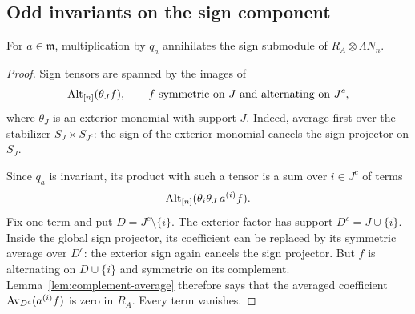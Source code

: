 \subsection{Odd invariants on the sign component}

\begin{lemma}\label{lem:odd-annihilation}
For $a\in\mathfrak m$, multiplication by $q_a$
annihilates the sign submodule of
$R_A\otimes\Lambda N_n$.
\end{lemma}

\begin{proof}
Sign tensors are spanned by the images of
\[
 \operatorname{Alt}_{[n]}(\theta_J f),
 \qquad
 f\text{ symmetric on }J
       \text{ and alternating on }J^c,
\]
where $\theta_J$ is an exterior monomial with support $J$.
Indeed, average first over the stabilizer
$S_J\times S_{J^c}$: the sign of the exterior monomial
cancels the sign projector on $S_J$.

Since $q_a$ is invariant, its product with such a tensor
is a sum over $i\in J^c$ of terms
\[
 \operatorname{Alt}_{[n]}(\theta_i\theta_J\,a^{(i)}f).
\]
Fix one term and put $D=J^c\setminus\{i\}$.
The exterior factor has support $D^c=J\cup\{i\}$.
Inside the global sign projector, its coefficient can
be replaced by its symmetric average over $D^c$:
the exterior sign again cancels the sign projector.
But $f$ is alternating on $D\cup\{i\}$ and symmetric
on its complement.  Lemma~\ref{lem:complement-average}
therefore says that the averaged coefficient
$\operatorname{Av}_{D^c}(a^{(i)}f)$ is zero in $R_A$.
Every term vanishes.
\end{proof}

